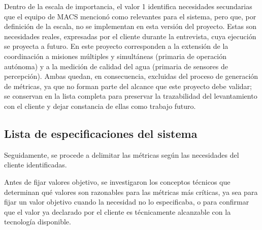 Dentro de la escala de importancia, el valor 1 identifica necesidades secundarias que el
equipo de MACS mencionó como relevantes para el sistema, pero que, por definición de la
escala, no se implementan en esta versión del proyecto. Estas son necesidades reales,
expresadas por el cliente durante la entrevista, cuya ejecución se proyecta a futuro. En este
proyecto corresponden a la extensión de la coordinación a misiones múltiples y simultáneas
(primaria de operación autónoma) y a la medición de calidad del agua (primaria de sensores
de percepción). Ambas quedan, en consecuencia, excluidas del proceso de generación de
métricas, ya que no forman parte del alcance que este proyecto debe validar; se conservan en
la lista completa para preservar la trazabilidad del levantamiento con el cliente y dejar
constancia de ellas como trabajo futuro.


\newpage

\subsection{Lista de especificaciones del sistema}

Seguidamente, se procede a delimitar las métricas según las necesidades del cliente identificadas.

Antes de fijar valores objetivo, se investigaron los conceptos técnicos que determinan qué valores
son razonables para las métricas más críticas, ya sea para fijar un valor objetivo cuando la
necesidad no lo especificaba, o para confirmar que el valor ya declarado por el cliente es
técnicamente alcanzable con la tecnología disponible.

